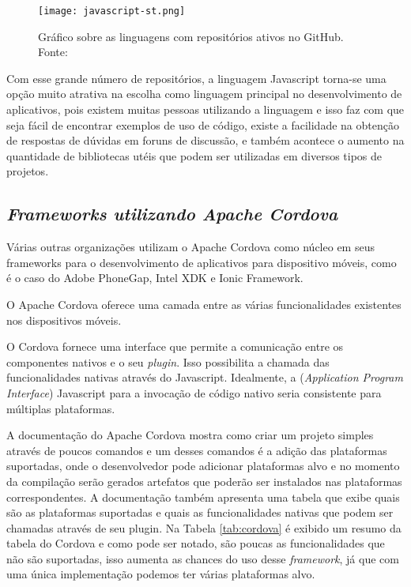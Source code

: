\begin{figure}[!htb]
	\centering
	\texttt{[image: javascript-st.png]} %
	\caption[Linguagens com maior número de repositórios ativos no GitHub]{Gráfico sobre as linguagens com repositórios ativos no GitHub. Fonte: \cite{githut}}
	\label{fig:javascript}
\end{figure}
\vspace{-3mm}

Com esse grande número de repositórios, a linguagem Javascript torna-se uma opção muito atrativa na escolha como linguagem principal no desenvolvimento de aplicativos, pois existem muitas pessoas utilizando a linguagem e isso faz com que seja fácil de encontrar exemplos de uso de código, existe a facilidade na obtenção de respostas de dúvidas em foruns de discussão, e também acontece o aumento na quantidade de bibliotecas utéis que podem ser utilizadas em diversos tipos de projetos.

\subsection{\normalfont\itshape Frameworks utilizando Apache Cordova}
Várias outras organizações utilizam o Apache Cordova como núcleo em seus frameworks para o desenvolvimento de aplicativos para dispositivo móveis, como é o caso do Adobe PhoneGap, Intel XDK e Ionic Framework.

O Apache Cordova oferece uma camada entre as várias funcionalidades existentes nos dispositivos móveis.
\begin{citacao}
O Cordova fornece uma interface que permite a comunicação entre os componentes nativos e o seu \textit{plugin}. Isso possibilita a chamada das funcionalidades nativas através do Javascript. Idealmente, a  (\textit{Application Program Interface}) Javascript para a invocação de código nativo seria consistente para múltiplas plataformas. \cite{cordova}
\end{citacao}

A documentação do Apache Cordova mostra como criar um projeto simples através de poucos comandos e um desses comandos é a adição das plataformas suportadas, onde o desenvolvedor pode adicionar plataformas alvo e no momento da compilação serão gerados artefatos que poderão ser instalados nas plataformas correspondentes.
A documentação também apresenta uma tabela que exibe quais são as plataformas suportadas e quais as funcionalidades nativas que podem ser chamadas através de seu plugin.
Na Tabela \ref{tab:cordova} é exibido um resumo da tabela do Cordova e como pode ser notado, são poucas as funcionalidades que não são suportadas, isso aumenta as chances do uso desse \textit{framework}, já que com uma única implementação podemos ter várias plataformas alvo.

